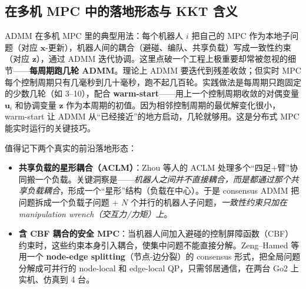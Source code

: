\subsection{在多机 MPC 中的落地形态与 KKT 含义}
\label{sec:cs-admm-mpc}

ADMM 在多机 MPC 里的典型用法：每个机器人 $i$ 把自己的 MPC 作为本地子问题（对应 $\mathbf{x}$-更新），机器人间的耦合（避碰、编队、共享负载）写成一致性约束（对应 $\mathbf{z}$），通过 ADMM 迭代协调。这里点破一个工程上极重要却常被忽视的细节——\textbf{每周期跑几轮 ADMM}。理论上 ADMM 要迭代到残差收敛；但实时 MPC 每个控制周期只有几毫秒到几十毫秒，跑不起几百轮。实践做法是每周期只跑固定的少数几轮（如 3--10），配合 \textbf{warm-start}——用上一个控制周期收敛的对偶变量 $\mathbf{u}_i$ 和协调变量 $\mathbf{z}$ 作为本周期的初值。因为相邻控制周期的最优解变化很小，warm-start 让 ADMM 从“已经接近”的地方启动，几轮就够用。这是分布式 MPC 能实时运行的关键技巧。

值得记下两个真实的前沿落地形态：
\begin{itemize}
  \item \textbf{共享负载的星形耦合（ACLM）}：Zhou 等人的 ACLM 处理多个“四足+臂”协同搬一个负载\cite{zhou2026aclm}。关键洞察是——\emph{机器人之间并不直接耦合，而是都通过那个共享负载耦合}，形成一个“星形”结构（负载在中心）。于是 consensus ADMM 把问题拆成一个负载子问题 + $N$ 个并行的机器人子问题，\emph{一致性约束只加在 manipulation wrench（交互力/力矩）上}。
  \item \textbf{含 CBF 耦合的安全 MPC}：当机器人间加入避碰的控制屏障函数（CBF）约束时，这些约束本身引入耦合，使集中问题不能直接分解。Zeng--Hamed 等用一个 \textbf{node-edge splitting}（节点-边分裂）的 consensus 形式，把全局问题分解成可并行的 node-local 和 edge-local QP，只需邻居通信，在两台 Go2 上实机、仿真到 4 台\cite{zeng2026admmcbf}。
\end{itemize}

